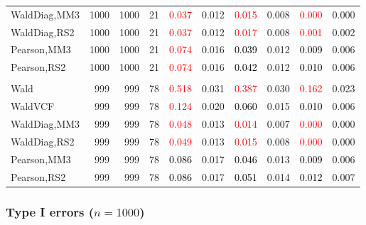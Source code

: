 \documentclass[
]{article}
\begin{document}
\begin{table}[H]
{\begin{tabular}[t]{lrrrrrrlrr}
\hspace{1em}WaldDiag,MM3 & 1000 & 1000 & 21 & \textcolor{red}{0.037} & 0.012 & \textcolor{red}{0.015} & 0.008 & \textcolor{red}{0.000} & 0.000\\
\hspace{1em}WaldDiag,RS2 & 1000 & 1000 & 21 & \textcolor{red}{0.037} & 0.012 & \textcolor{red}{0.017} & 0.008 & \textcolor{red}{0.001} & 0.002\\
\hspace{1em}Pearson,MM3 & 1000 & 1000 & 21 & \textcolor{red}{0.074} & 0.016 & \textcolor{black}{0.039} & 0.012 & \textcolor{black}{0.009} & 0.006\\
\hspace{1em}Pearson,RS2 & 1000 & 1000 & 21 & \textcolor{red}{0.074} & 0.016 & \textcolor{black}{0.042} & 0.012 & \textcolor{black}{0.010} & 0.006\\
\addlinespace[0.3em]
\multicolumn{10}{l}{\textbf{3F 15V}}\\
\hspace{1em}Wald & 999 & 999 & 78 & \textcolor{red}{0.518} & 0.031 & \textcolor{red}{0.387} & 0.030 & \textcolor{red}{0.162} & 0.023\\
\hspace{1em}WaldVCF & 999 & 999 & 78 & \textcolor{red}{0.124} & 0.020 & \textcolor{black}{0.060} & 0.015 & \textcolor{black}{0.010} & 0.006\\
\hspace{1em}WaldDiag,MM3 & 999 & 999 & 78 & \textcolor{red}{0.048} & 0.013 & \textcolor{red}{0.014} & 0.007 & \textcolor{red}{0.000} & 0.000\\
\hspace{1em}WaldDiag,RS2 & 999 & 999 & 78 & \textcolor{red}{0.049} & 0.013 & \textcolor{red}{0.015} & 0.008 & \textcolor{red}{0.000} & 0.000\\
\hspace{1em}Pearson,MM3 & 999 & 999 & 78 & \textcolor{black}{0.086} & 0.017 & \textcolor{black}{0.046} & 0.013 & \textcolor{black}{0.009} & 0.006\\
\hspace{1em}Pearson,RS2 & 999 & 999 & 78 & \textcolor{black}{0.086} & 0.017 & \textcolor{black}{0.051} & 0.014 & \textcolor{black}{0.012} & 0.007\\
\bottomrule
\end{tabular}}
\endgroup{}
\end{table}

\hypertarget{type-i-errors-n1000-2}{%
\subsubsection{\texorpdfstring{Type I errors
(\(n=1000\))}{Type I errors (n=1000)}}\label{type-i-errors-n1000-2}}
\end{document}
